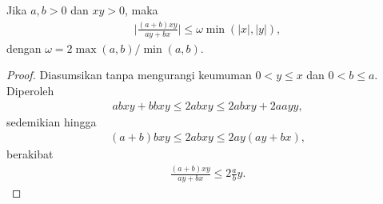 


\begin{lemma}\label{Wbound}
    Jika $a,b > 0$ dan $xy>0$, maka
    \begin{align*}
        \Bigg|\frac{(a+b)xy}{ay+bx}\Bigg| \leq \omega \min(|x|,|y|),
    \end{align*}
    dengan $\omega = 2 \max(a,b)/\min(a,b)$.
\end{lemma}

\begin{proof}
    Diasumsikan tanpa mengurangi keumuman $0 < y \leq x$ dan $0 < b \leq a$. Diperoleh
    \begin{align*}
        abxy + bbxy \leq 2abxy \leq 2abxy + 2aayy,
    \end{align*}
    sedemikian hingga
    \begin{align*}
        (a + b)bxy \leq 2abxy \leq 2ay(ay + bx),
    \end{align*}
    berakibat
    \begin{align*}
        \frac{(a + b)xy}{ay + bx}\leq 2\frac{a}{b}y.
    \end{align*}
\end{proof}

